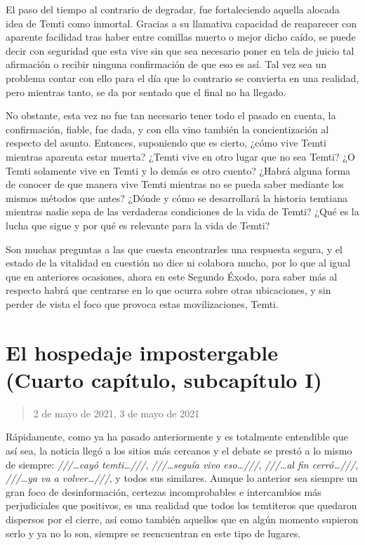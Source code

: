 \documentclass[
  spanish,
]{book}
\begin{document}
El paso del tiempo al contrario de degradar, fue fortaleciendo aquella alocada idea de Temti como inmortal. Gracias a su llamativa capacidad de reaparecer con aparente facilidad tras haber entre comillas muerto o mejor dicho caído, se puede decir con seguridad que esta vive sin que sea necesario poner en tela de juicio tal afirmación o recibir ninguna confirmación de que eso es así.
Tal vez sea un problema contar con ello para el día que lo contrario se convierta en una realidad, pero mientras tanto, se da por sentado que el final no ha llegado.

No obstante, esta vez no fue tan necesario tener todo el pasado en cuenta, la confirmación, fiable, fue dada, y con ella vino también la concientización al respecto del asunto.
Entonces, suponiendo que es cierto, ¿cómo vive Temti mientras aparenta estar muerta? ¿Temti vive en otro lugar que no sea Temti? ¿O Temti solamente vive en Temti y lo demás es otro cuento? ¿Habrá alguna forma de conocer de que manera vive Temti mientras no se pueda saber mediante los mismos métodos que antes? ¿Dónde y cómo se desarrollará la historia temtiana mientras nadie sepa de las verdaderas condiciones de la vida de Temti? ¿Qué es la lucha que sigue y por qué es relevante para la vida de Temti?

Son muchas preguntas a las que cuesta encontrarles una respuesta segura, y el estado de la vitalidad en cuestión no dice ni colabora mucho, por lo que al igual que en anteriores ocasiones, ahora en este Segundo Éxodo, para saber más al respecto habrá que centrarse en lo que ocurra sobre otras ubicaciones, y sin perder de vista el foco que provoca estas movilizaciones, Temti.

\hypertarget{el-hospedaje-impostergable-cuarto-capuxedtulo-subcapuxedtulo-i}{%
\section{El hospedaje impostergable (Cuarto capítulo, subcapítulo I)}\label{el-hospedaje-impostergable-cuarto-capuxedtulo-subcapuxedtulo-i}}

\begin{quote}
2 de mayo de 2021, 3 de mayo de 2021
\end{quote}

Rápidamente, como ya ha pasado anteriormente y es totalmente entendible que así sea, la noticia llegó a los sitios más cercanos y el debate se prestó a lo mismo de siempre: \emph{///\ldots cayó temti\ldots///}, \emph{///\ldots seguía vivo eso\ldots///}, \emph{///\ldots al fin cerró\ldots///}, \emph{///\ldots ya va a volver\ldots///}, y todos sus similares.
Aunque lo anterior sea siempre un gran foco de desinformación, certezas incomprobables e intercambios más perjudiciales que positivos, es una realidad que todos los temtiteros que quedaron dispersos por el cierre, así como también aquellos que en algún momento supieron serlo y ya no lo son, siempre se reencuentran en este tipo de lugares.
\end{document}
